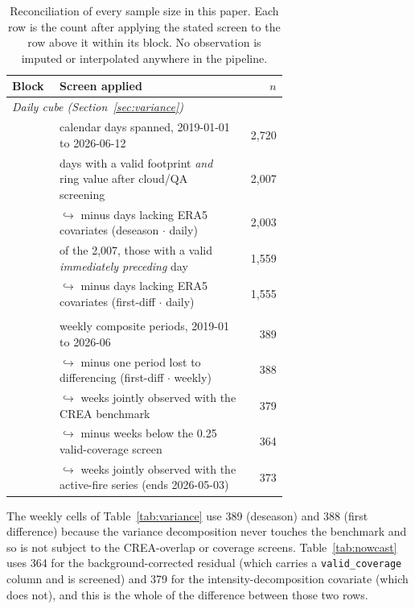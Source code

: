 \documentclass[11pt,a4paper]{article}
\begin{document}
\begin{table}[t]
\centering
\caption{Reconciliation of every sample size in this paper. Each row is the count after applying
the stated screen to the row above it within its block. No observation is imputed or
interpolated anywhere in the pipeline.}
\label{tab:n}
\small
\begin{tabular}{@{}l p{0.68\linewidth} r@{}}
\toprule
Block & Screen applied & $n$ \\
\midrule
\multicolumn{3}{l}{\emph{Daily cube (Section~\ref{sec:variance})}}\\
& calendar days spanned, 2019-01-01 to 2026-06-12 & 2{,}720 \\
& days with a valid footprint \emph{and} ring value after cloud/QA screening & 2{,}007 \\
& \quad$\hookrightarrow$ minus days lacking ERA5 covariates \; (deseason $\cdot$ daily) & 2{,}003 \\
& of the 2{,}007, those with a valid \emph{immediately preceding} day & 1{,}559 \\
& \quad$\hookrightarrow$ minus days lacking ERA5 covariates \; (first-diff $\cdot$ daily) & 1{,}555 \\
\addlinespace
\multicolumn{3}{l}{\emph{Weekly cube}}\\
& weekly composite periods, 2019-01 to 2026-06 & 389 \\
& \quad$\hookrightarrow$ minus one period lost to differencing (first-diff $\cdot$ weekly) & 388 \\
& \quad$\hookrightarrow$ weeks jointly observed with the CREA benchmark & 379 \\
& \quad\quad$\hookrightarrow$ minus weeks below the 0.25 valid-coverage screen & 364 \\
& \quad$\hookrightarrow$ weeks jointly observed with the active-fire series (ends 2026-05-03) & 373 \\
\bottomrule
\end{tabular}
\end{table}

\noindent The weekly cells of Table~\ref{tab:variance} use 389 (deseason) and 388 (first
difference) because the variance decomposition never touches the benchmark and so is not subject
to the CREA-overlap or coverage screens. Table~\ref{tab:nowcast} uses 364 for the
background-corrected residual (which carries a \texttt{valid\_coverage} column and is screened)
and 379 for the intensity-decomposition covariate (which does not), and this is the whole of the
difference between those two rows.
\end{document}
